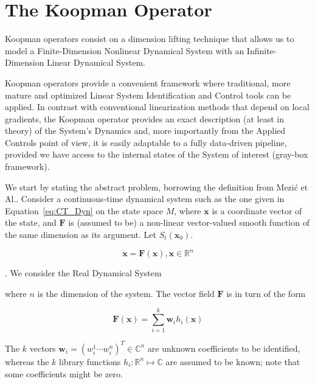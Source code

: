 \documentclass{article}
\begin{document}
\section{The Koopman Operator}

    Koopman operators consist on a dimension lifting technique that allows us to model a Finite-Dimension Nonlinear Dynamical System with an Infinite-Dimension Linear Dynamical System.
    
    Koopman operators provide a convenient framework where traditional, more mature and optimized Linear System Identification and Control tools can be applied. In contrast with conventional linearization methods that depend on local gradients, the Koopman operator provides an exact description (at least in theory) of the System's Dynamics and, more importantly from the Applied Controls point of view, it is easily adaptable to a fully data-driven pipeline, provided we have access to the internal states of the System of interest (gray-box framework).

    We start by stating the abstract problem, borrowing the definition from
    Mezić et Al.\cite{Koopman_Basics}. Consider a continuous-time dynamical system such as the one given in Equation~\ref{eq:CT_Dyn} on the state space $M$, where $\mathbf{x}$ is a coordinate vector of the state, and $\textbf{F}$ is (assumed to be) a non-linear vector-valued smooth function of the same dimension as its argument. Let $S_t(\mathbf{x}_0)$.

    \begin{equation}\label{eq:CT_Dyn}
        \mathbf{\dot{x}} = \mathbf{F}\left( \mathbf{x} \right) , \mathbf{x} \in \mathbb{R}^n
    \end{equation}
    
    
    \cite{Goncalves}. We consider the Real Dynamical System

    where $n$ is the dimension of the system. The vector field $\mathbf{F}$ is in turn of the form

    \begin{equation}
        \mathbf{F}(\mathbf{x}) = \sum_{i = 1}^{k} \mathbf{w}_i h_i \left( \mathbf{x} \right)
    \end{equation}

    The $k$ vectors $\mathbf{w}_i = \left( w_i^1 \cdots w_i^n \right)^T \in \mathbb{C}^n$ are unknown coefficients to be identified, whereas the $k$ library functions $h_i : \mathbb{R}^n \mapsto \mathbb{C}$ are assumed to be known; note that some coefficients might be zero.



    
\end{document}
